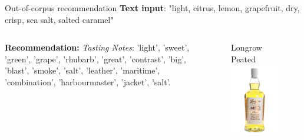 \documentclass{beamer}
\begin{document}
	\begin{frame}{Out-of-corpus recommendation}
		\textbf{Text input}: "light, citrus, lemon, grapefruit, dry, crisp, sea salt, salted caramel"
	
		\begin{columns}
			\begin{column}{0.5\textwidth}
				\textbf{Recommendation:}
				\textit{Tasting Notes}: 'light', 'sweet', 'green', 'grape', 'rhubarb', 'great', 'contrast', 'big', 'blast', 'smoke', 'salt', 'leather', 'maritime', 'combination', 'harbourmaster', 'jacket', 'salt'.
			\end{column}
					\begin{column}{0.5\textwidth}
						\begin{figure}[H]
						\begin{center}
							Longrow Peated
						\includegraphics[scale = 0.3]{longrow_peated}
						\end{center}
					\end{figure}
		\end{column}
		\end{columns}	
\end{frame}
\end{document}
